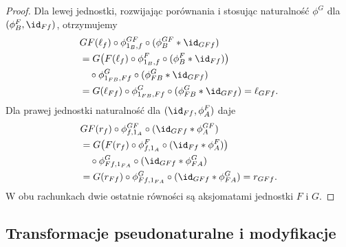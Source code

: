 \begin{proof}
Dla lewej jednostki, rozwijając porównania i stosując naturalność $\phi^G$ dla $(\phi^F_B,\id_{Ff})$, otrzymujemy
\[
\begin{aligned}
 &GF(\ell_f)\circ\phi^{GF}_{1_B,f}
       \circ(\phi^{GF}_B\ast\id_{GFf})\\
 &=G\bigl(F(\ell_f)\circ\phi^F_{1_B,f}
       \circ(\phi^F_B\ast\id_{Ff})\bigr)\\
 &\quad\circ\phi^G_{1_{FB},Ff}\circ(\phi^G_{FB}\ast\id_{GFf})\\
 &=G(\ell_{Ff})\circ\phi^G_{1_{FB},Ff}
       \circ(\phi^G_{FB}\ast\id_{GFf})
 =\ell_{GFf}.
\end{aligned}
\]
Dla prawej jednostki naturalność dla $(\id_{Ff},\phi^F_A)$ daje
\[
\begin{aligned}
 &GF(r_f)\circ\phi^{GF}_{f,1_A}
       \circ(\id_{GFf}\ast\phi^{GF}_A)\\
 &=G\bigl(F(r_f)\circ\phi^F_{f,1_A}
       \circ(\id_{Ff}\ast\phi^F_A)\bigr)\\
 &\quad\circ\phi^G_{Ff,1_{FA}}\circ(\id_{GFf}\ast\phi^G_{FA})\\
 &=G(r_{Ff})\circ\phi^G_{Ff,1_{FA}}
       \circ(\id_{GFf}\ast\phi^G_{FA})
 =r_{GFf}.
\end{aligned}
\]
W obu rachunkach dwie ostatnie równości są aksjomatami jednostki $F$ i $G$.
\end{proof}

\subsection{Transformacje pseudonaturalne i modyfikacje}

